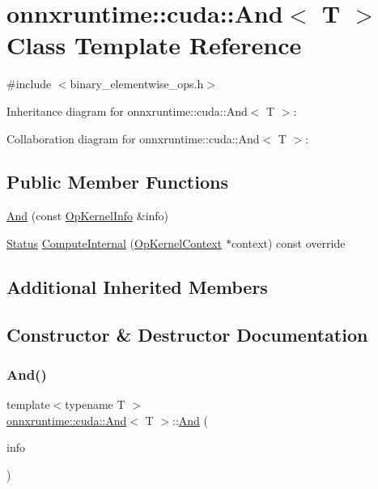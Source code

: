 \hypertarget{classonnxruntime_1_1cuda_1_1And}{}\section{onnxruntime\+:\+:cuda\+:\+:And$<$ T $>$ Class Template Reference}
\label{classonnxruntime_1_1cuda_1_1And}


{\ttfamily \#include $<$binary\+\_\+elementwise\+\_\+ops.\+h$>$}



Inheritance diagram for onnxruntime\+:\+:cuda\+:\+:And$<$ T $>$\+:


Collaboration diagram for onnxruntime\+:\+:cuda\+:\+:And$<$ T $>$\+:
\subsection*{Public Member Functions}
\begin{DoxyCompactItemize}
\item 
\mbox{\hyperlink{classonnxruntime_1_1cuda_1_1And_af4e06a52ef1482e742562376089ffc74}{And}} (const \mbox{\hyperlink{classonnxruntime_1_1OpKernelInfo}{Op\+Kernel\+Info}} \&info)
\item 
\mbox{\hyperlink{classonnxruntime_1_1common_1_1Status}{Status}} \mbox{\hyperlink{classonnxruntime_1_1cuda_1_1And_a691b266d0442b0d513fe433c2e0c04d8}{Compute\+Internal}} (\mbox{\hyperlink{classonnxruntime_1_1OpKernelContext}{Op\+Kernel\+Context}} $\ast$context) const override
\end{DoxyCompactItemize}
\subsection*{Additional Inherited Members}


\subsection{Constructor \& Destructor Documentation}
\mbox{\label{classonnxruntime_1_1cuda_1_1And_af4e06a52ef1482e742562376089ffc74}} 
\subsubsection{\texorpdfstring{And()}{And()}}
{\footnotesize\ttfamily template$<$typename T $>$ \\
\mbox{\hyperlink{classonnxruntime_1_1cuda_1_1And}{onnxruntime\+::cuda\+::\+And}}$<$ T $>$\+::\mbox{\hyperlink{classonnxruntime_1_1cuda_1_1And}{And}} (\begin{DoxyParamCaption}\item[{const \mbox{\hyperlink{classonnxruntime_1_1OpKernelInfo}{Op\+Kernel\+Info}} \&}]{info }\end{DoxyParamCaption})\hspace{0.3cm}{\ttfamily [inline]}}



